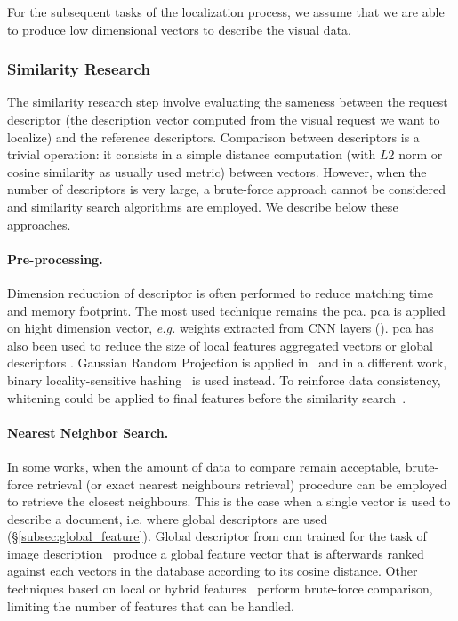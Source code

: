 For the subsequent tasks of the localization process, we assume that we are able to produce low dimensional vectors to describe the visual data.

\subsubsection{Similarity Research}
\label{subsubsec:similarity_research}

The similarity research step involve evaluating the sameness between the request descriptor (\ie the description vector computed from the visual request we want to localize) and the reference descriptors. Comparison between descriptors is a trivial operation: it consists in a simple distance computation (with $L2$ norm or cosine similarity as usually used metric) between vectors. However, when the number of descriptors is very large, a brute-force approach cannot be considered and similarity search algorithms are employed. We describe below these approaches.

\paragraph{Pre-processing.}
Dimension reduction of descriptor is often performed to reduce matching time and memory footprint. The most used technique remains the \ac{pca}. \ac{pca} is applied on hight dimension vector, \textit{e.g.} weights extracted from CNN layers (\citep{Arandjelovic2017,Gordo2016}). \ac{pca} has also been used to reduce the size of local features aggregated vectors \citep{Kim2015,Torii2015} or global descriptors \citep{Ni2009}. Gaussian Random Projection is applied in~\citep{Sunderhauf2015a,Panphattarasap2016} and in a different work, binary locality-sensitive hashing~\citep{Sunderhauf2015} is used instead. To reinforce data consistency, whitening could be applied to final features before the similarity search~\citep{Jegou2012a,Gong2014,Tolias2016,Arandjelovic2017,Gordo2016,Radenovic2016}.

\paragraph{Nearest Neighbor Search.}
In some works, when the amount of data to compare remain acceptable, brute-force retrieval (or exact nearest neighbours retrieval) procedure can be employed to retrieve the closest neighbours. This is the case when a single vector is used to describe a document, i.e. where global descriptors are used (\S\ref{subsec:global_feature}). Global descriptor from \ac{cnn} trained for the task of image description~\citep{Babenko2014,Sunderhauf2015,Radenovic2016,Gordo2016,Arandjelovic2017} produce a global feature vector that is afterwards ranked against each vectors in the database according to its cosine distance. Other techniques based on local or hybrid features~\citep{Zamir2010,Zamir2014,Sunderhauf2015a} perform brute-force comparison, limiting the number of features that can be handled.


